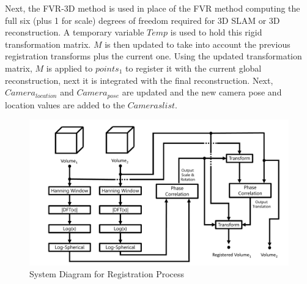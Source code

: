 Next, the FVR-3D method is used in place of the FVR method computing the full six (plus 1 for scale) degrees of freedom required for 3D SLAM or 3D reconstruction. A temporary variable $Temp$ is used to hold this rigid transformation matrix. $M$ is then updated to take into account the previous registration transforms plus the current one. Using the updated transformation matrix, $M$ is applied to $points_1$ to register it with the current global reconstruction, next it is integrated with the final reconstruction. Next, $Camera_{location}$ and $Camera_{pose}$ are updated and the new camera pose and location values are added to the $Cameras list$. \\



\begin{figure}[!htb]
\centering
\includegraphics[width=6.0in]{images/ch2/pipeline2}
\caption{System Diagram for Registration Process}
\label{fig:PIPELINE}
\end{figure}






